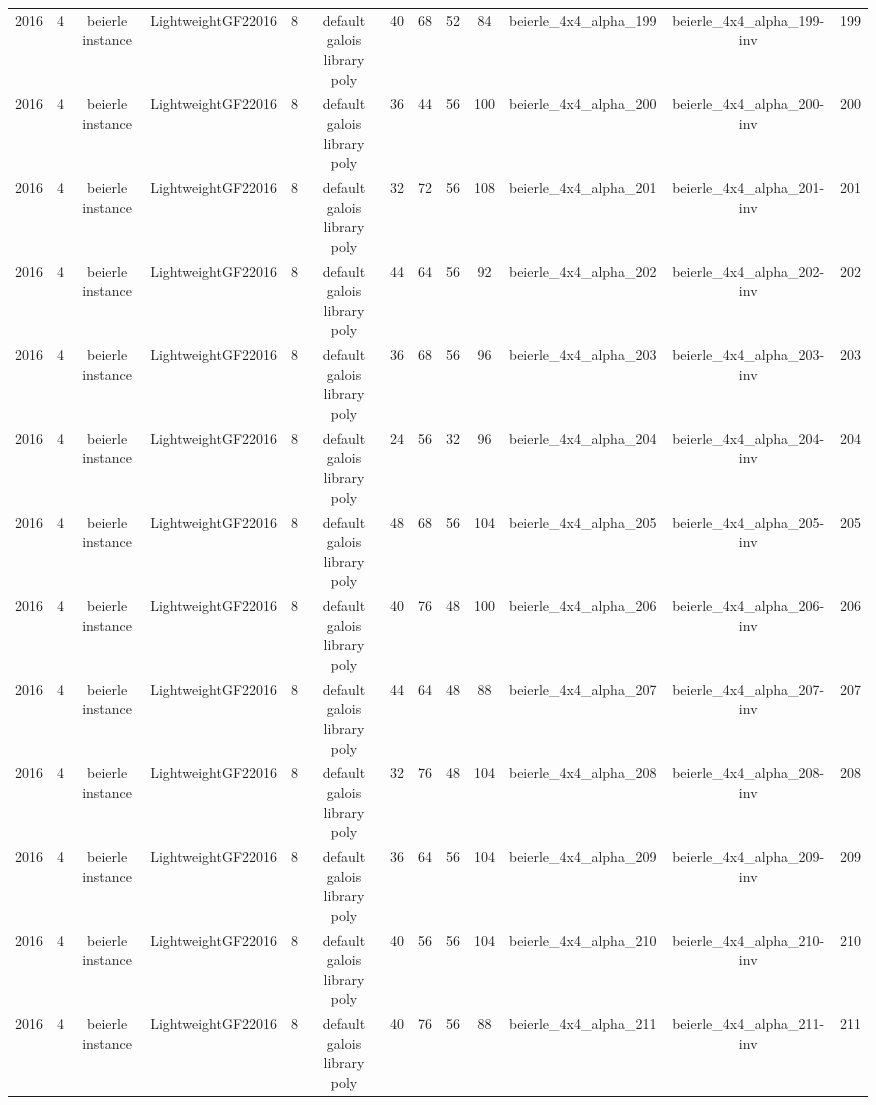 \begin{tabular}{c c c c c c c c c c c c c}
2016 & 4 & beierle instance & LightweightGF22016 & 8 & default galois library poly & 40 & 68 & 52 & 84 & beierle_4x4_alpha_199 & beierle_4x4_alpha_199-inv & 199 \\
2016 & 4 & beierle instance & LightweightGF22016 & 8 & default galois library poly & 36 & 44 & 56 & 100 & beierle_4x4_alpha_200 & beierle_4x4_alpha_200-inv & 200 \\
2016 & 4 & beierle instance & LightweightGF22016 & 8 & default galois library poly & 32 & 72 & 56 & 108 & beierle_4x4_alpha_201 & beierle_4x4_alpha_201-inv & 201 \\
2016 & 4 & beierle instance & LightweightGF22016 & 8 & default galois library poly & 44 & 64 & 56 & 92 & beierle_4x4_alpha_202 & beierle_4x4_alpha_202-inv & 202 \\
2016 & 4 & beierle instance & LightweightGF22016 & 8 & default galois library poly & 36 & 68 & 56 & 96 & beierle_4x4_alpha_203 & beierle_4x4_alpha_203-inv & 203 \\
2016 & 4 & beierle instance & LightweightGF22016 & 8 & default galois library poly & 24 & 56 & 32 & 96 & beierle_4x4_alpha_204 & beierle_4x4_alpha_204-inv & 204 \\
2016 & 4 & beierle instance & LightweightGF22016 & 8 & default galois library poly & 48 & 68 & 56 & 104 & beierle_4x4_alpha_205 & beierle_4x4_alpha_205-inv & 205 \\
2016 & 4 & beierle instance & LightweightGF22016 & 8 & default galois library poly & 40 & 76 & 48 & 100 & beierle_4x4_alpha_206 & beierle_4x4_alpha_206-inv & 206 \\
2016 & 4 & beierle instance & LightweightGF22016 & 8 & default galois library poly & 44 & 64 & 48 & 88 & beierle_4x4_alpha_207 & beierle_4x4_alpha_207-inv & 207 \\
2016 & 4 & beierle instance & LightweightGF22016 & 8 & default galois library poly & 32 & 76 & 48 & 104 & beierle_4x4_alpha_208 & beierle_4x4_alpha_208-inv & 208 \\
2016 & 4 & beierle instance & LightweightGF22016 & 8 & default galois library poly & 36 & 64 & 56 & 104 & beierle_4x4_alpha_209 & beierle_4x4_alpha_209-inv & 209 \\
2016 & 4 & beierle instance & LightweightGF22016 & 8 & default galois library poly & 40 & 56 & 56 & 104 & beierle_4x4_alpha_210 & beierle_4x4_alpha_210-inv & 210 \\
2016 & 4 & beierle instance & LightweightGF22016 & 8 & default galois library poly & 40 & 76 & 56 & 88 & beierle_4x4_alpha_211 & beierle_4x4_alpha_211-inv & 211 \\

\end{tabular}
